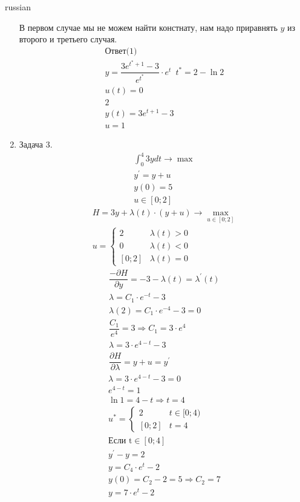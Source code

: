 \documentclass{article}
\begin{document}
\begin{otherlanguage*}{russian}
\begin{enumerate}
В первом случае мы не можем найти констнату, нам надо приравнять $ y $ из второго и третьего случая.
\begin{align*}
\text{Ответ} 
\text{(1) } \\
y = \dfrac{3 e ^{t^* + 1} - 3 }{e^{t ^*}} \cdot e ^ t \,\,\, t^* = 2 - \ln 2 \\
u(t)  = 0 \\
\text{2} \\
y(t) = 3e ^{t+1} - 3 \\
u = 1 
\end{align*}
\item Задача 3. 
\begin{align*}
\int_0^4 3 y dt \rightarrow \max \\
y^{'} = y + u \\
y(0) = 5 \\
u \in [0;2 ] 
\end{align*}
\begin{align*}
H = 3 y + \lambda (t) \cdot (y + u ) \rightarrow \max_{u \in [0;2]} \\
u = \begin{cases}
2 & \lambda(t) > 0 \\
0 & \lambda (t) < 0 \\
[0; 2] & \lambda (t) = 0 
\end{cases}
\end{align*}
\begin{align*}
\dfrac{- \partial H}{\partial y} = -3 - \lambda(t) = \lambda^{'} (t) \\
\lambda = C_1 \cdot e ^{-t} - 3 \\
\lambda (2) = C_1 \cdot e ^{-4} - 3 = 0 \\
\dfrac{C_1}{e^4} = 3 \Rightarrow C_1 = 3 \cdot e ^ 4 \\ 
\lambda = 3 \cdot e ^{4 - t}  - 3 \\ 
\dfrac{\partial H}{\partial \lambda} = y + u = y ^{'} 
\end{align*}
\begin{align*}
\lambda  = 3 \cdot e ^{4 - t} - 3 = 0 \\
e^{4 - t} = 1 \\
\ln 1 = 4 - t \Rightarrow t = 4 \\
u^* = \begin{cases}
2 & t \in [0; 4) \\
[0; 2] & t = 4 
\end{cases} \\
\text{Если t} \in [0; 4] \\
y^{'} - y = 2 \\
y = C_4 \cdot e^t - 2 \\
y(0) = C_2 - 2 = 5 \Rightarrow C_2 = 7 \\
y = 7 \cdot e ^ t -2  \\
\end{align*}


\end{enumerate}
\end{otherlanguage*}
\end{document}
